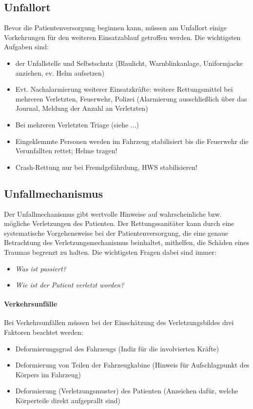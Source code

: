 \subsection{Unfallort}
Bevor die Patientenversorgung beginnen kann, müssen am Unfallort einige Vorkehrungen für den weiteren Einsatzablauf getroffen werden. Die wichtigsten Aufgaben sind:
\begin{itemize}
	\item {} der Unfallstelle und Selbstschutz
	(Blaulicht, Warnblinkanlage, Uniformjacke anziehen, ev. Helm aufsetzen)
	\item Evt. Nachalarmierung weiterer Einsatzkräfte:
	weitere Rettungsmittel bei mehreren Verletzten, Feuerwehr, Polizei (Alarmierung ausschließlich über das Journal, Meldung der Anzahl an Verletzten)
	\item Bei mehreren Verletzten Triage (siehe ...)
	\item Eingeklemmte Personen werden im Fahrzeug stabilisiert bis die Feuerwehr die Verunfallten rettet; Helme tragen!
	\item Crash-Rettung nur bei Fremdgefährdung, HWS stabilisieren!
\end{itemize}

\subsection{Unfallmechanismus}
Der Unfallmechanismus gibt wertvolle Hinweise auf wahrscheinliche bzw. mögliche Verletzungen des Patienten. Der Rettungssanitäter kann durch eine systematische Vorgehensweise bei der Patientenversorgung, die eine genaue Betrachtung des Verletzungsmechanismus beinhaltet, mithelfen, die Schäden eines Traumas begrenzt zu halten. Die wichtigsten Fragen dabei sind immer:
\begin{itemize}
    \item \emph{Was ist passiert?}
    \item \emph{Wie ist der Patient verletzt worden?}
\end{itemize}

\paragraph{Verkehrsunfälle}

Bei Verkehrsunfällen müssen bei der Einschätzung des Verletzungsbildes drei Faktoren beachtet werden:
\begin{itemize}
    \item Deformierungsgrad des Fahrzeugs (Indiz für die involvierten Kräfte)
    \item Deformierung von Teilen der Fahrzeugkabine (Hinweis für Aufschlagpunkt
    des Körpers im Fahrzeug)
    \item Deformierung (Verletzungsmuster) des Patienten (Anzeichen dafür, welche Körperteile direkt aufgeprallt sind)
\end{itemize}

